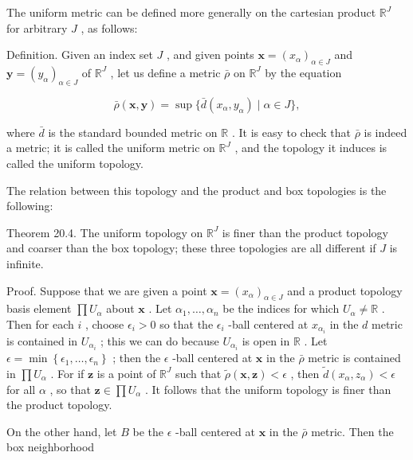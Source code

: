 The uniform metric can be defined more generally on the cartesian product \({\mathbb{R}}^{J}\) for arbitrary \(J\) , as follows:

Definition. Given an index set \(J\) , and given points \(\mathbf{x} = {\left( {x}_{\alpha }\right) }_{\alpha  \in  J}\) and \(\mathbf{y} = {\left( {y}_{\alpha }\right) }_{\alpha  \in  J}\) of \({\mathbb{R}}^{J}\) , let us define a metric \(\bar{\rho }\) on \({\mathbb{R}}^{J}\) by the equation

\[
\bar{\rho }\left( {\mathbf{x},\mathbf{y}}\right)  = \sup \{ \bar{d}\left( {{x}_{\alpha },{y}_{\alpha }}\right)  \mid  \alpha  \in  J\} ,
\]

where \(\bar{d}\) is the standard bounded metric on \(\mathbb{R}\) . It is easy to check that \(\bar{\rho }\) is indeed a metric; it is called the uniform metric on \({\mathbb{R}}^{J}\) , and the topology it induces is called the uniform topology.

The relation between this topology and the product and box topologies is the following:

Theorem 20.4. The uniform topology on \({\mathbb{R}}^{J}\) is finer than the product topology and coarser than the box topology; these three topologies are all different if \(J\) is infinite.

Proof. Suppose that we are given a point \(\mathbf{x} = {\left( {x}_{\alpha }\right) }_{\alpha  \in  J}\) and a product topology basis element \(\prod {U}_{\alpha }\) about \(\mathbf{x}\) . Let \({\alpha }_{1},\ldots ,{\alpha }_{n}\) be the indices for which \({U}_{\alpha } \neq  \mathbb{R}\) . Then for each \(i\) , choose \({\epsilon }_{i} > 0\) so that the \({\epsilon }_{i}\) -ball centered at \({x}_{{\alpha }_{i}}\) in the \(d\) metric is contained in \({U}_{{\alpha }_{i}}\) ; this we can do because \({U}_{{\alpha }_{i}}\) is open in \(\mathbb{R}\) . Let \(\epsilon  = \min \left\{  {{\epsilon }_{1},\ldots ,{\epsilon }_{n}}\right\}\) ; then the \(\epsilon\) -ball centered at \(\mathbf{x}\) in the \(\bar{\rho }\) metric is contained in \(\prod {U}_{\alpha }\) . For if \(\mathbf{z}\) is a point of \({\mathbb{R}}^{J}\) such that \(\widetilde{\rho }\left( {\mathbf{x},\mathbf{z}}\right)  < \epsilon\) , then \(\widetilde{d}\left( {{x}_{\alpha },{z}_{\alpha }}\right)  < \epsilon\) for all \(\alpha\) , so that \(\mathbf{z} \in  \prod {U}_{\alpha }\) . It follows that the uniform topology is finer than the product topology.

On the other hand, let \(B\) be the \(\epsilon\) -ball centered at \(\mathbf{x}\) in the \(\bar{\rho }\) metric. Then the box neighborhood

